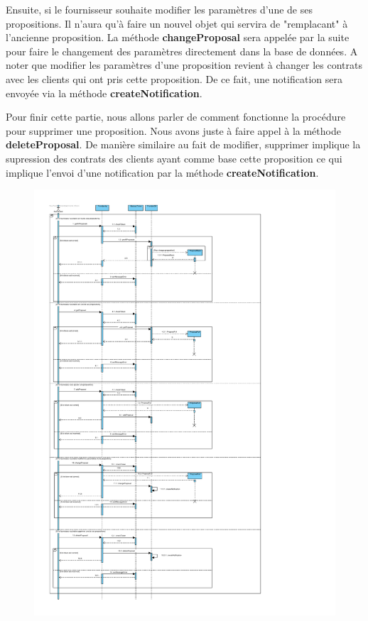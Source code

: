 \begin{flushleft}
Ensuite, si le fournisseur souhaite modifier les paramètres d'une de ses propositions. Il n'aura qu'à faire un nouvel objet qui servira de "remplacant" à l'ancienne proposition. La méthode \textbf{changeProposal} sera appelée par la suite pour faire le changement des paramètres directement dans la base de données. A noter que modifier les paramètres d'une proposition revient à changer les contrats avec les clients qui ont pris cette proposition. De ce fait, une notification sera envoyée via la méthode \textbf{createNotification}.
\end{flushleft}

\begin{flushleft}
Pour finir cette partie, nous allons parler de comment fonctionne la procédure pour supprimer une proposition. Nous avons juste à faire appel à la méthode \textbf{deleteProposal}. De manière similaire au fait de modifier, supprimer implique la supression des contrats des clients ayant comme base cette proposition ce qui implique l'envoi d'une notification par la méthode \textbf{createNotification}.
\end{flushleft}

\newpage
\begin{figure}[h]
    \centering
    \includegraphics[height = 0.9\textwidth]{Base/sequence/img/fournisseur/voir_les_propositions.pdf}
\end{figure}


